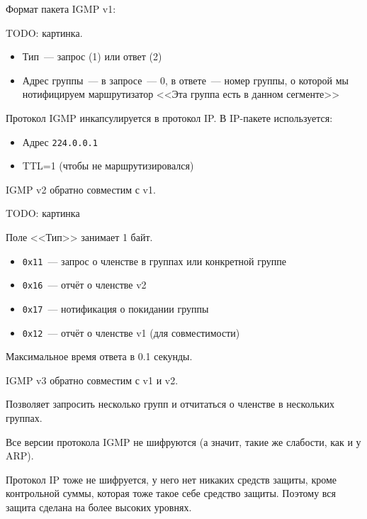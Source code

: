 Формат пакета IGMP v1:

TODO: картинка.

\begin{itemize}
    \item Тип~--- запрос (1) или ответ (2)
    \item Адрес группы~--- в запросе~--- 0, в ответе~--- номер группы, о которой мы нотифицируем маршрутизатор <<Эта группа есть в данном сегменте>>
\end{itemize}

Протокол IGMP инкапсулируется в протокол IP. В IP-пакете используется:
\begin{itemize}
    \item Адрес {\tt 224.0.0.1}
    \item TTL=1 (чтобы не маршрутизировался)
\end{itemize}

IGMP v2 обратно совместим с v1.

TODO: картинка

Поле <<Тип>> занимает 1 байт.
\begin{itemize}
    \item {\tt 0x11}~--- запрос о членстве в группах или конкретной группе
    \item {\tt 0x16}~--- отчёт о членстве v2
    \item {\tt 0x17}~--- нотификация о покидании группы
    \item {\tt 0x12}~--- отчёт о членстве v1 (для совместимости)
\end{itemize}

Максимальное время ответа в 0.1 секунды.

IGMP v3 обратно совместим с v1 и v2.

Позволяет запросить несколько групп и отчитаться о членстве в нескольких группах.

Все версии протокола IGMP не шифруются (а значит, такие же слабости, как и у ARP).

Протокол IP тоже не шифруется, у него нет никаких средств защиты, кроме контрольной суммы, которая тоже такое себе средство защиты. Поэтому вся защита сделана на более высоких уровнях.